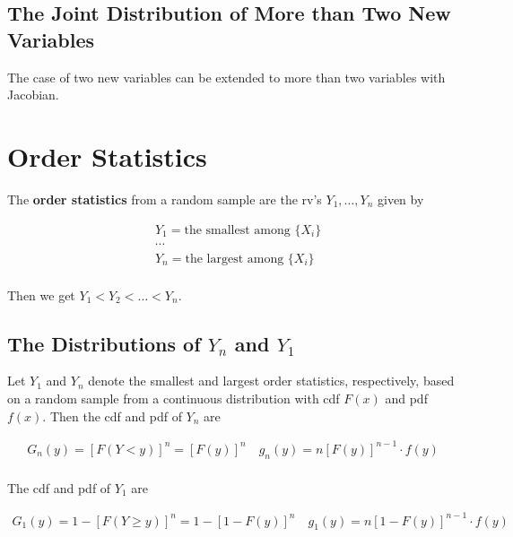 \subsection{The Joint Distribution of More than Two New Variables}

The case of two new variables can be extended to more than two variables with Jacobian.

\section{Order Statistics}

\begin{definition}
    The \textbf{order statistics} from a random sample are the rv's $Y_1,\dots,Y_n$ given by 

    \begin{align*}
        & Y_1 = \text{the smallest among }\{X_i\} \\
        & \cdots \\
        & Y_n = \text{the largest among }\{X_i\} \\
    \end{align*}

    Then we get $Y_1<Y_2<\dots<Y_n$.
\end{definition}

\subsection{The Distributions of $Y_n$ and $Y_1$}

\begin{proposition}
    Let $Y_1$ and $Y_n$ denote the smallest and largest order statistics, respectively, based on a random sample from a continuous distribution with cdf $F(x)$ and pdf $f(x)$. Then the cdf and pdf of $Y_n$ are 

    \begin{align*}
        G_n(y) = [F(Y<y)]^n = [F(y)]^n\quad g_n(y) = n[F(y)]^{n-1}\cdot f(y) \\
    \end{align*}

    The cdf and pdf of $Y_1$ are 

    \begin{align*}
        G_1(y) = 1 - [F(Y\geq y)]^n = 1 - [1-F(y)]^n\quad g_1(y) = n[1-F(y)]^{n-1}\cdot f(y) \\
    \end{align*}
\end{proposition}

